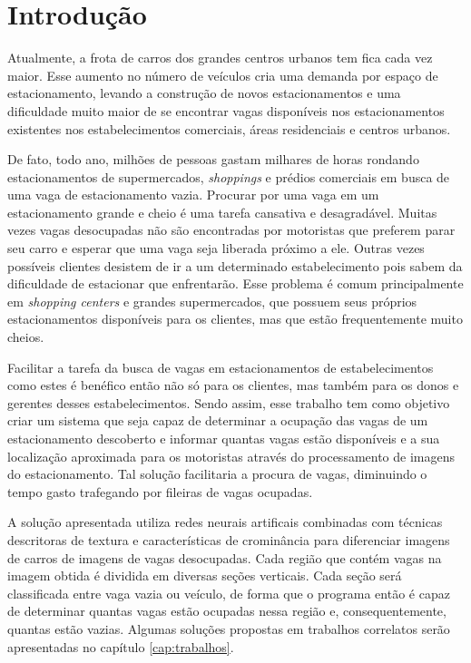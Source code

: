 \chapter{Introdução}\label{cap:intro}

			Atualmente, a frota de carros dos grandes centros urbanos tem fica cada vez maior. Esse aumento no número de veículos cria uma demanda por espaço de estacionamento, levando a construção de novos estacionamentos e uma dificuldade muito maior de se encontrar vagas disponíveis nos estacionamentos existentes nos estabelecimentos comerciais, áreas residenciais e centros urbanos.
			
			De fato, todo ano, milhões de pessoas gastam milhares de horas rondando estacionamentos de supermercados, \textit{shoppings} e prédios comerciais em busca de uma vaga de estacionamento vazia. Procurar por uma vaga em um estacionamento grande e cheio é uma tarefa cansativa e desagradável. Muitas vezes vagas desocupadas não são encontradas por motoristas que preferem parar seu carro e esperar que uma vaga seja liberada próximo a ele. Outras vezes possíveis clientes desistem de ir a um determinado estabelecimento pois sabem da dificuldade de estacionar que enfrentarão. Esse problema é comum principalmente em \textit{shopping centers} e grandes supermercados, que possuem seus próprios estacionamentos disponíveis para os clientes, mas que estão frequentemente muito cheios.
			
			Facilitar a tarefa da busca de vagas em estacionamentos de estabelecimentos como estes é benéfico então não só para os clientes, mas também para os donos e gerentes desses estabelecimentos. Sendo assim, esse trabalho tem como objetivo criar um sistema que seja capaz de determinar a ocupação das vagas de um estacionamento descoberto e informar quantas vagas estão disponíveis e a sua localização aproximada para os motoristas através do processamento de imagens do estacionamento. Tal solução facilitaria a procura de vagas, diminuindo o tempo gasto trafegando por fileiras de vagas ocupadas.
			
			A solução apresentada utiliza redes neurais artificais combinadas com técnicas descritoras de textura e características de crominância para diferenciar imagens de carros de imagens de vagas desocupadas. Cada região que contém vagas na imagem obtida é dividida em diversas seções verticais. Cada seção será classificada entre vaga vazia ou veículo, de forma que o programa então é capaz de determinar quantas vagas estão ocupadas nessa região e, consequentemente, quantas estão vazias. Algumas soluções propostas em trabalhos correlatos serão apresentadas no capítulo \ref{cap:trabalhos}.
			
